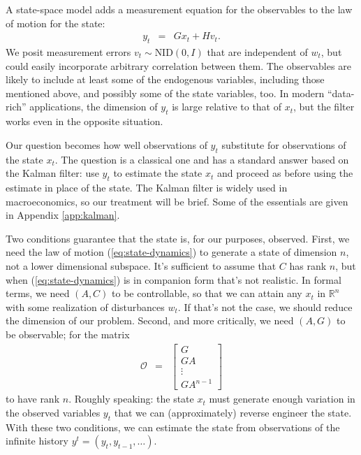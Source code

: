 \documentclass[11pt]{article}
\begin{document}
{A state-space model adds a measurement equation for the observables
 to the law of motion for the state:
\begin{eqnarray}
    y_t &=& G x_t + H v_t .
        \label{eq:meas}
\end{eqnarray}
We posit measurement errors $v_t \sim \mbox{NID}(0,I)$ that are independent of $w_t$,
but could easily incorporate arbitrary correlation between them.
The observables are likely to include at least some of the endogenous
variables, including those mentioned above,
and possibly some of the state variables, too.
In modern ``data-rich'' applications, the dimension of $y_t$ is large
relative to that of $x_t$,
but the filter works even in the opposite situation.

Our question becomes how well observations
of $y_t$ substitute for observations of the state $x_t$.
The question is a classical one and has a standard answer
based on the Kalman filter:
use $y_t$ to estimate the state $x_t$ and proceed as before
using the estimate in place of the state.
The Kalman filter is widely used in macroeconomics,
so our treatment will be brief.
Some of the essentials are given in Appendix \ref{app:kalman}.

Two conditions guarantee that the state is, for our purposes, observed.
First, we need the law of motion (\ref{eq:state-dynamics})
to generate a state of dimension $n$, not a lower dimensional subspace.
It's sufficient to assume that $C$ has rank $n$,
but when (\ref{eq:state-dynamics}) is in companion form that's not realistic.
In formal terms, we need $(A,C)$ to be controllable,
so that we can attain any $x_t$ in $\mathbb{R}^n$ with some realization of disturbances $w_t$.
If that's not the case, we should reduce the dimension of our problem.
Second, and more critically, we need $(A,G)$ to be observable;
for the matrix
\begin{eqnarray*}
    \mathcal{O} &=&
    \left[
    \begin{array}{c}
        G \\ G  A  \\ \vdots \\ G  A ^{n-1}
    \end{array}
    \right]
\end{eqnarray*}
to have rank $n$.
Roughly speaking: the state $x_t$ must generate enough variation in the observed variables $y_t$
that we can (approximately) reverse engineer the state.
With these two conditions, we can estimate the state
from observations of the infinite history $y^t = (y_t, y_{t-1}, \ldots)$.

}
\end{document}

